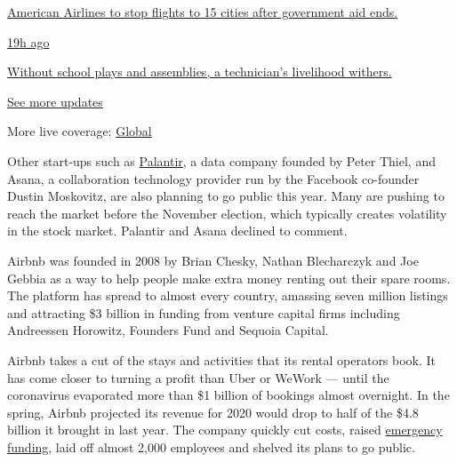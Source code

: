 \href{https://www.nytimes3xbfgragh.onion/live/2020/08/20/business/stock-market-today-coronavirus?action=click\&pgtype=Article\&state=default\&region=MAIN_CONTENT_1\&context=storylines_live_updates\#american-airlines-to-stop-flights-to-15-cities-after-government-aid-ends}{American
Airlines to stop flights to 15 cities after government aid ends.}

\href{https://www.nytimes3xbfgragh.onion/live/2020/08/20/business/stock-market-today-coronavirus?action=click\&pgtype=Article\&state=default\&region=MAIN_CONTENT_1\&context=storylines_live_updates\#without-school-plays-and-assemblies-a-technicians-livelihood-withers}{19h
ago}

\href{https://www.nytimes3xbfgragh.onion/live/2020/08/20/business/stock-market-today-coronavirus?action=click\&pgtype=Article\&state=default\&region=MAIN_CONTENT_1\&context=storylines_live_updates\#without-school-plays-and-assemblies-a-technicians-livelihood-withers}{Without
school plays and assemblies, a technician's livelihood withers.}

\href{https://www.nytimes3xbfgragh.onion/live/2020/08/20/business/stock-market-today-coronavirus?action=click\&pgtype=Article\&state=default\&region=MAIN_CONTENT_1\&context=storylines_live_updates}{See
more updates}

More live coverage:
\href{https://www.nytimes3xbfgragh.onion/2020/08/20/world/coronavirus-covid.html?action=click\&pgtype=Article\&state=default\&region=MAIN_CONTENT_1\&context=storylines_live_updates}{Global}

Other start-ups such as
\href{https://www.nytimes3xbfgragh.onion/2020/07/06/technology/palantir-technologies-ipo.html}{Palantir},
a data company founded by Peter Thiel, and Asana, a collaboration
technology provider run by the Facebook co-founder Dustin Moskovitz, are
also planning to go public this year. Many are pushing to reach the
market before the November election, which typically creates volatility
in the stock market. Palantir and Asana declined to comment.

Airbnb was founded in 2008 by Brian Chesky, Nathan Blecharczyk and Joe
Gebbia as a way to help people make extra money renting out their spare
rooms. The platform has spread to almost every country, amassing seven
million listings and attracting \$3 billion in funding from venture
capital firms including Andreessen Horowitz, Founders Fund and Sequoia
Capital.

Airbnb takes a cut of the stays and activities that its rental operators
book. It has come closer to turning a profit than Uber or WeWork ---
until the coronavirus evaporated more than \$1 billion of bookings
almost overnight. In the spring, Airbnb projected its revenue for 2020
would drop to half of the \$4.8 billion it brought in last year. The
company quickly cut costs, raised
\href{https://www.nytimes3xbfgragh.onion/2020/04/06/technology/airbnb-coronavirus-valuation.html}{emergency
funding}, laid off almost 2,000 employees and shelved its plans to go
public.

